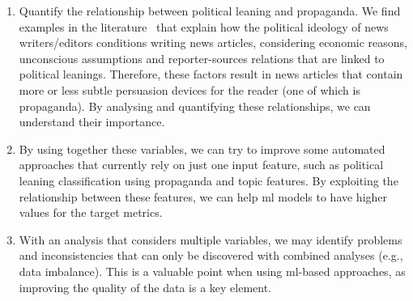     \begin{enumerate}
        \item Quantify the relationship between political leaning and propaganda. 
        We find examples in the literature~\citep{schudson2002news} that explain how the political ideology of news writers/editors conditions writing news articles, considering economic reasons, unconscious assumptions and reporter-sources relations that are linked to political leanings. Therefore, these factors result in news articles that contain more or less subtle persuasion devices for the reader (one of which is propaganda). By analysing and quantifying these relationships, we can understand their importance.
        \item By using together these variables, we can try to improve some automated approaches that currently rely on just one input feature, such as political leaning classification
        using propaganda and topic features. By exploiting the relationship between these features, we can help \acrfull{ml} models to have higher values for the target metrics. %
        \item With an analysis that considers multiple variables, we may identify problems and inconsistencies that can only be discovered with combined analyses (e.g., data imbalance). This is a valuable point when using \acrshort{ml}-based approaches, as improving the quality of the data is a key element. %
    \end{enumerate}
